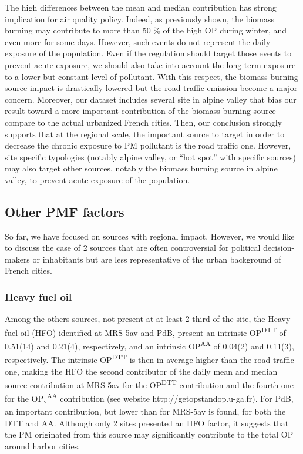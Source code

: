 \documentclass[
]{article}
\begin{document}
The high differences between the mean and median contribution has strong
implication for air quality policy. Indeed, as previously shown, the
biomass burning may contribute to more than 50 \% of the high OP during
winter, and even more for some days. However, such events do not
represent the daily exposure of the population. Even if the regulation
should target those events to prevent acute exposure, we should also
take into account the long term exposure to a lower but constant level
of pollutant. With this respect, the biomass burning source impact is
drastically lowered but the road traffic emission become a major
concern. Moreover, our dataset includes several site in alpine valley
that bias our result toward a more important contribution of the biomass
burning source compare to the actual urbanized French cities. Then, our
conclusion strongly supports that at the regional scale, the important
source to target in order to decrease the chronic exposure to PM
pollutant is the road traffic one. However, site specific typologies
(notably alpine valley, or ``hot spot'' with specific sources) may also
target other sources, notably the biomass burning source in alpine
valley, to prevent acute exposure of the population.

\hypertarget{other-pmf-factors}{%
\subsection{Other PMF factors}\label{other-pmf-factors}}

So far, we have focused on sources with regional impact. However, we
would like to discuss the case of 2 sources that are often controversial
for political decision-makers or inhabitants but are less representative
of the urban background of French cities.

\hypertarget{heavy-fuel-oil}{%
\subsubsection{Heavy fuel oil}\label{heavy-fuel-oil}}

Among the others sources, not present at at least 2 third of the site,
the Heavy fuel oil (HFO) identified at MRS-5av and PdB, present an
intrinsic OP\textsuperscript{DTT} of 0.51(14) and 0.21(4), respectively,
and an intrinsic OP\textsuperscript{AA} of 0.04(2) and 0.11(3),
respectively. The intrinsic OP\textsuperscript{DTT} is then in average
higher than the road traffic one, making the HFO the second contributor
of the daily mean and median source contribution at MRS-5av for the
OP\textsuperscript{DTT} contribution and the fourth one for the
OP\textsubscript{v}\textsuperscript{AA} contribution (see website
http://getopstandop.u-ga.fr). For PdB, an important contribution, but
lower than for MRS-5av is found, for both the DTT and AA. Although only
2 sites presented an HFO factor, it suggests that the PM originated from
this source may significantly contribute to the total OP around harbor
cities.
\end{document}

